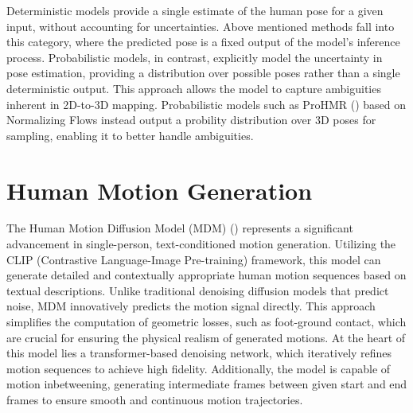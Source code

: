 Deterministic models provide a single estimate of the human pose for a given input, without accounting for uncertainties. Above mentioned methods fall into this category, where the predicted pose is a fixed output of the model's inference process. Probabilistic models, in contrast, explicitly model the uncertainty in pose estimation, providing a distribution over possible poses rather than a single deterministic output. This approach allows the model to capture ambiguities inherent in 2D-to-3D mapping. Probabilistic models such as ProHMR (\cite{kolotouros2021prohmr}) based on Normalizing Flows instead output a probility distribution over 3D poses for sampling, enabling it to better handle ambiguities.






\section{Human Motion Generation}












The Human Motion Diffusion Model (MDM) (\cite{tevet2023human}) represents a significant advancement in single-person, text-conditioned motion generation. Utilizing the CLIP (Contrastive Language-Image Pre-training) framework, this model can generate detailed and contextually appropriate human motion sequences based on textual descriptions. Unlike traditional denoising diffusion models that predict noise, MDM innovatively predicts the motion signal directly. This approach simplifies the computation of geometric losses, such as foot-ground contact, which are crucial for ensuring the physical realism of generated motions. At the heart of this model lies a transformer-based denoising network, which iteratively refines motion sequences to achieve high fidelity. Additionally, the model is capable of motion inbetweening, generating intermediate frames between given start and end frames to ensure smooth and continuous motion trajectories.

